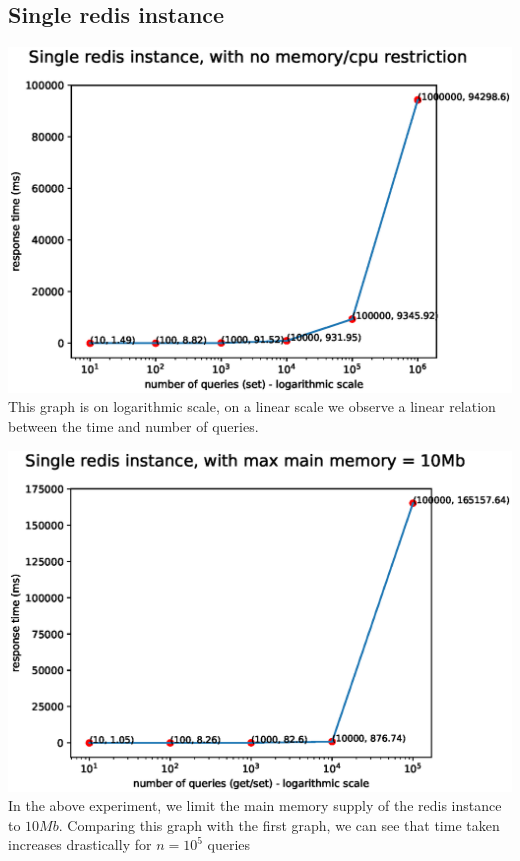 \documentclass[11pt]{article}
\begin{document}
\subsection*{Single redis instance}
\includegraphics[width=\textwidth]{fig1.eps}
This graph is on logarithmic scale, on a linear scale we observe a linear
relation between the time and number of queries.

\includegraphics[width=\textwidth]{fig2.eps}
In the above experiment, we limit the main memory supply of the
redis instance to $10Mb$. Comparing this graph with the first graph,
we can see that time taken increases drastically for $n=10^5$ queries
\end{document}
